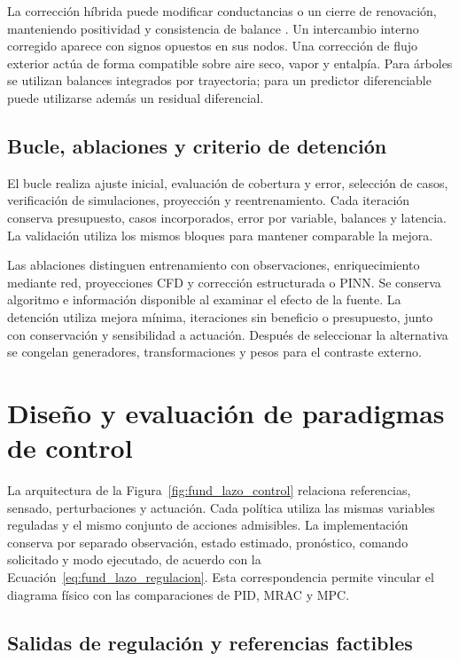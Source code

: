 La corrección híbrida puede modificar conductancias o un cierre de renovación, manteniendo positividad y consistencia de balance \cite{psichogios1992}. Un intercambio interno corregido aparece con signos opuestos en sus nodos. Una corrección de flujo exterior actúa de forma compatible sobre aire seco, vapor y entalpía. Para árboles se utilizan balances integrados por trayectoria; para un predictor diferenciable puede utilizarse además un residual diferencial.

\subsection{Bucle, ablaciones y criterio de detención}

El bucle realiza ajuste inicial, evaluación de cobertura y error, selección de casos, verificación de simulaciones, proyección y reentrenamiento. Cada iteración conserva presupuesto, casos incorporados, error por variable, balances y latencia. La validación utiliza los mismos bloques para mantener comparable la mejora.

Las ablaciones distinguen entrenamiento con observaciones, enriquecimiento mediante red, proyecciones CFD y corrección estructurada o PINN. Se conserva algoritmo e información disponible al examinar el efecto de la fuente. La detención utiliza mejora mínima, iteraciones sin beneficio o presupuesto, junto con conservación y sensibilidad a actuación. Después de seleccionar la alternativa se congelan generadores, transformaciones y pesos para el contraste externo.

\section{Diseño y evaluación de paradigmas de control}
\label{met:control}

La arquitectura de la Figura~\ref{fig:fund_lazo_control} relaciona referencias, sensado, perturbaciones y actuación. Cada política utiliza las mismas variables reguladas y el mismo conjunto de acciones admisibles. La implementación conserva por separado observación, estado estimado, pronóstico, comando solicitado y modo ejecutado, de acuerdo con la Ecuación~\eqref{eq:fund_lazo_regulacion}. Esta correspondencia permite vincular el diagrama físico con las comparaciones de PID, MRAC y MPC.

\subsection{Salidas de regulación y referencias factibles}

